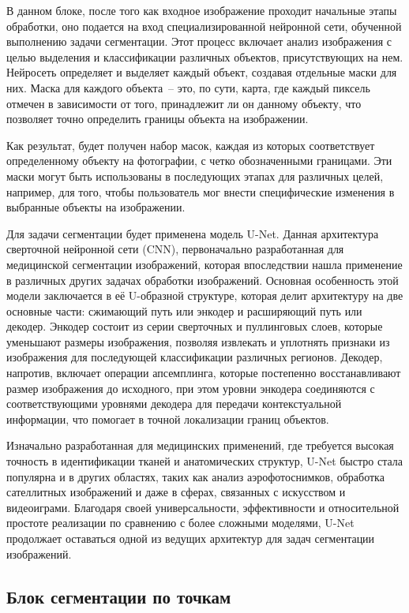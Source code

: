 В данном блоке, после того как входное изображение проходит начальные этапы обработки, оно подается на вход специализированной нейронной сети, обученной выполнению задачи сегментации. Этот процесс включает анализ изображения с целью выделения и классификации различных объектов, присутствующих на нем. Нейросеть определяет и выделяет каждый объект, создавая отдельные маски для них. Маска для каждого объекта~-- это, по сути, карта, где каждый пиксель отмечен в зависимости от того, принадлежит ли он данному объекту, что позволяет точно определить границы объекта на изображении.

Как результат, будет получен набор масок, каждая из которых соответствует определенному объекту на фотографии, с четко обозначенными границами. Эти маски могут быть использованы в последующих этапах для различных целей, например, для того, чтобы пользователь мог внести специфические изменения в выбранные объекты на изображении.

Для задачи сегментации будет применена модель U-Net. Данная архитектура сверточной нейронной сети (CNN), первоначально разработанная для медицинской сегментации изображений, которая впоследствии нашла применение в различных других задачах обработки изображений. Основная особенность этой модели заключается в её U-образной структуре, которая делит архитектуру на две основные части: сжимающий путь или энкодер и расширяющий путь или декодер. Энкодер состоит из серии сверточных и пуллинговых слоев, которые уменьшают размеры изображения, позволяя извлекать и уплотнять признаки из изображения для последующей классификации различных регионов. Декодер, напротив, включает операции апсемплинга, которые постепенно восстанавливают размер изображения до исходного, при этом уровни энкодера соединяются с соответствующими уровнями декодера для передачи контекстуальной информации, что помогает в точной локализации границ объектов.

Изначально разработанная для медицинских применений, где требуется высокая точность в идентификации тканей и анатомических структур, U-Net быстро стала популярна и в других областях, таких как анализ аэрофотоснимков, обработка сателлитных изображений и даже в сферах, связанных с искусством и видеоиграми. Благодаря своей универсальности, эффективности и относительной простоте реализации по сравнению с более сложными моделями, U-Net продолжает оставаться одной из ведущих архитектур для задач сегментации изображений.

\subsection{Блок сегментации по точкам}

